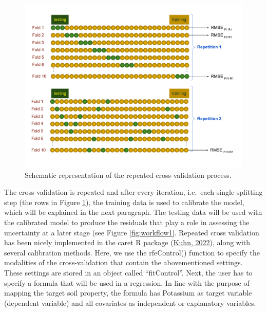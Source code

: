 \documentclass[
  10pt,
  b5paper,
  oneside]{book}
\begin{document}
\begin{figure}
\includegraphics[width=27.78in]{images/cv} \caption{Schematic representation of the repeated cross-validation process.}\label{fig:cv}
\end{figure}

The cross-validation is repeated and after every iteration, i.e.~each single splitting step (the rows in Figure \ref{fig:cv}), the training data is used to calibrate the model, which will be explained in the next paragraph. The testing data will be used with the calibrated model to produce the residuals that play a role in assessing the uncertainty at a later stage (see Figure \ref{fig:workflow1}.
Repeated cross validation has been nicely implemented in the caret R package (\protect\hyperlink{ref-Kuhn2022}{Kuhn, 2022}), along with several calibration methods. Here, we use the rfeControl() function to specify the modalities of the cross-validation that contain the abovementioned settings. These settings are stored in an object called ``fitControl''. Next, the user has to specify a formula that will be used in a regression. In line with the purpose of mapping the target soil property, the formula has Potassium as target variable (dependent variable) and all covariates as independent or explanatory variables.
\end{document}

